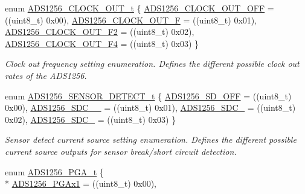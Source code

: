 \begin{DoxyCompactItemize}
enum \hyperlink{group__ads1256__driver_ga2d683909a58aa0617ee7c5d06d0a489f}{A\-D\-S1256\-\_\-\-C\-L\-O\-C\-K\-\_\-\-O\-U\-T\-\_\-t} \{ \hyperlink{group__ads1256__driver_gga2d683909a58aa0617ee7c5d06d0a489fa916ced2e355d66e2d3a92b8c2a0b7ec0}{A\-D\-S1256\-\_\-\-C\-L\-O\-C\-K\-\_\-\-O\-U\-T\-\_\-\-O\-F\-F} = ((uint8\-\_\-t) 0x00), 
\hyperlink{group__ads1256__driver_gga2d683909a58aa0617ee7c5d06d0a489fa8647029ebfcad85600d3ffcae0dc476c}{A\-D\-S1256\-\_\-\-C\-L\-O\-C\-K\-\_\-\-O\-U\-T\-\_\-\-F} = ((uint8\-\_\-t) 0x01), 
\hyperlink{group__ads1256__driver_gga2d683909a58aa0617ee7c5d06d0a489fa3e9c4c939f623dbf12efa9b029d9ce8b}{A\-D\-S1256\-\_\-\-C\-L\-O\-C\-K\-\_\-\-O\-U\-T\-\_\-\-F2} = ((uint8\-\_\-t) 0x02), 
\hyperlink{group__ads1256__driver_gga2d683909a58aa0617ee7c5d06d0a489fa0bfbba7f2973a961feca70e5c3ecf7f2}{A\-D\-S1256\-\_\-\-C\-L\-O\-C\-K\-\_\-\-O\-U\-T\-\_\-\-F4} = ((uint8\-\_\-t) 0x03)
 \}
\begin{DoxyCompactList}\small\item\em Clock out frequency setting enumeration. Defines the different possible clock out rates of the A\-D\-S1256. \end{DoxyCompactList}\item 
enum \hyperlink{group__ads1256__driver_gaa3102e98865ba4e72463676779cd62d4}{A\-D\-S1256\-\_\-\-S\-E\-N\-S\-O\-R\-\_\-\-D\-E\-T\-E\-C\-T\-\_\-t} \{ \hyperlink{group__ads1256__driver_ggaa3102e98865ba4e72463676779cd62d4a916890dc39cbdbb4bc7eb2b83df10810}{A\-D\-S1256\-\_\-\-S\-D\-\_\-\-O\-F\-F} = ((uint8\-\_\-t) 0x00), 
\hyperlink{group__ads1256__driver_ggaa3102e98865ba4e72463676779cd62d4a3157602ce936edb0fe99427c78815ced}{A\-D\-S1256\-\_\-\-S\-D\-C\-\_\-\_} = ((uint8\-\_\-t) 0x01), 
\hyperlink{group__ads1256__driver_ggaa3102e98865ba4e72463676779cd62d4a9d3134a67a27b194dbaed692d7266e2e}{A\-D\-S1256\-\_\-\-S\-D\-C\-\_} = ((uint8\-\_\-t) 0x02), 
\hyperlink{group__ads1256__driver_ggaa3102e98865ba4e72463676779cd62d4a3c2671f14301baa37c7ec1397068037e}{A\-D\-S1256\-\_\-\-S\-D\-C\-\_} = ((uint8\-\_\-t) 0x03)
 \}
\begin{DoxyCompactList}\small\item\em Sensor detect current source setting enumeration. Defines the different possible current source outputs for sensor break/short circuit detection. \end{DoxyCompactList}\item 
enum \hyperlink{group__ads1256__driver_gace2e231df7cd3598eb26d5ff51171701}{A\-D\-S1256\-\_\-\-P\-G\-A\-\_\-t} \{ \\*
\hyperlink{group__ads1256__driver_ggace2e231df7cd3598eb26d5ff51171701a3d71ca28a4b57bae10b35448e957e62f}{A\-D\-S1256\-\_\-\-P\-G\-Ax1} = ((uint8\-\_\-t) 0x00), 

\end{DoxyCompactItemize}
